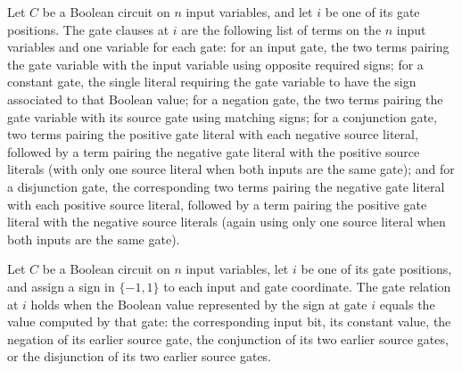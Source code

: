 \begin{definition}
\label{FABL.BooleanCircuit.gateClauses}
\leanok
{}
Let $C$ be a Boolean circuit on $n$ input variables, and let $i$ be one of its gate
positions. The gate clauses at $i$ are the following list of terms on the $n$ input
variables and one variable for each gate: for an input gate, the two terms pairing the
gate variable with the input variable using opposite required signs; for a constant
gate, the single literal requiring the gate variable to have the sign associated to that
Boolean value; for a negation gate, the two terms pairing the gate variable with its
source gate using matching signs; for a conjunction gate, two terms pairing the positive
gate literal with each negative source literal, followed by a term pairing the negative
gate literal with the positive source literals (with only one source literal when both
inputs are the same gate); and for a disjunction gate, the corresponding two terms
pairing the negative gate literal with each positive source literal, followed by a term
pairing the positive gate literal with the negative source literals (again using only
one source literal when both inputs are the same gate).
\end{definition}

\begin{definition}
\label{FABL.BooleanCircuit.gateRelation}
\leanok
{}
Let $C$ be a Boolean circuit on $n$ input variables, let $i$ be one of its gate
positions, and assign a sign in $\{ -1,1\}$ to each input and gate coordinate. The gate
relation at $i$ holds when the Boolean value represented by the sign at gate $i$ equals
the value computed by that gate: the corresponding input bit, its constant value, the
negation of its earlier source gate, the conjunction of its two earlier source gates, or
the disjunction of its two earlier source gates.
\end{definition}

